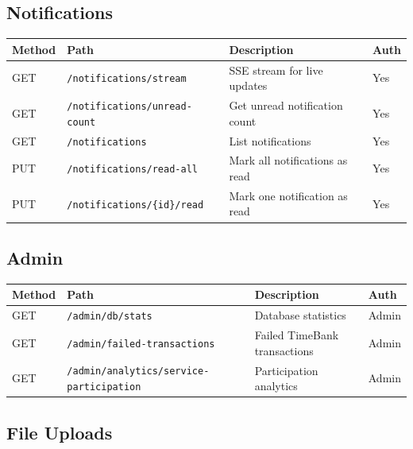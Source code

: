 \documentclass[11pt,a4paper]{report}
\begin{document}
\subsection{Notifications}

\begin{longtable}{|l|p{6.5cm}|p{5cm}|l|}
    \hline
    \textbf{Method} & \textbf{Path}                        & \textbf{Description}           & \textbf{Auth} \\
    \hline
    \endhead
    GET             & \texttt{/notifications/stream}       & SSE stream for live updates    & Yes           \\
    \hline
    GET             & \texttt{/notifications/unread-count} & Get unread notification count  & Yes           \\
    \hline
    GET             & \texttt{/notifications}              & List notifications             & Yes           \\
    \hline
    PUT             & \texttt{/notifications/read-all}     & Mark all notifications as read & Yes           \\
    \hline
    PUT             & \texttt{/notifications/\{id\}/read}  & Mark one notification as read  & Yes           \\
    \hline
\end{longtable}

\subsection{Admin}

\begin{longtable}{|l|p{6.5cm}|p{5cm}|l|}
    \hline
    \textbf{Method} & \textbf{Path}                                   & \textbf{Description}         & \textbf{Auth} \\
    \hline
    \endhead
    GET             & \texttt{/admin/db/stats}                        & Database statistics          & Admin         \\
    \hline
    GET             & \texttt{/admin/failed-transactions}             & Failed TimeBank transactions & Admin         \\
    \hline
    GET             & \texttt{/admin/analytics/service-participation} & Participation analytics      & Admin         \\
    \hline
\end{longtable}

\subsection{File Uploads}
\end{document}
